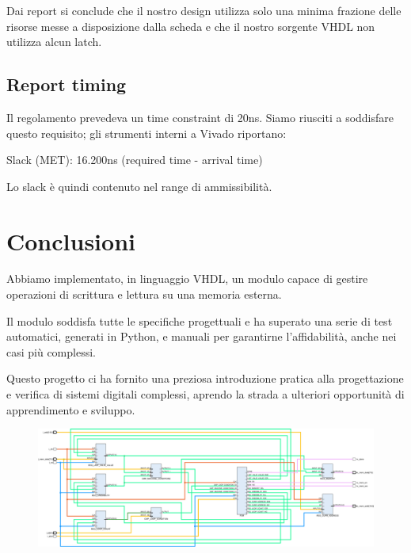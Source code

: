 \documentclass[a4paper]{article}
\begin{document}
Dai report si conclude che il nostro design utilizza solo una minima frazione delle risorse messe a disposizione dalla scheda e che il nostro sorgente VHDL non utilizza alcun latch. 

\subsection{Report timing}

Il regolamento prevedeva un time constraint di 20ns. Siamo riusciti a soddisfare questo requisito; gli strumenti interni a Vivado riportano:

\centerline{Slack (MET): 16.200ns (required time - arrival time)}

Lo slack è quindi contenuto nel range di ammissibilità.

\section{Conclusioni}
Abbiamo implementato, in linguaggio VHDL, un modulo capace di gestire operazioni di scrittura e lettura su una memoria esterna.

Il modulo soddisfa tutte le specifiche progettuali e ha superato una serie di test automatici, generati in Python, e manuali per garantirne l'affidabilità, anche nei casi più complessi.

Questo progetto ci ha fornito una preziosa introduzione pratica alla progettazione e verifica di sistemi digitali complessi, aprendo la strada a ulteriori opportunità di apprendimento e sviluppo.

\newpage
\thispagestyle{empty}
\begin{landscape}
    \begin{figure}
        \centering
        \centerline{
        \includegraphics[width=29cm]{resources/Datapath.png}
        }
    \end{figure}
\end{landscape}
\end{document}
